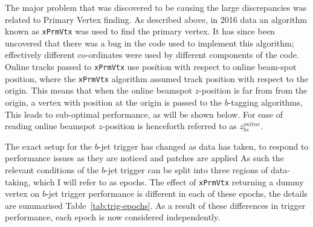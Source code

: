 The major problem that was discovered to be causing the large discrepancies was related to Primary Vertex finding.
As described above, in 2016 data an algorithm known as \verb|xPrmVtx| was used to find the primary vertex.
It has since been uncovered that there was a bug in the code used to implement this algorithm;
effectively different co-ordinates were used by different components of the code.
Online tracks passed to \verb|xPrmVtx| use position with respect to online beam-spot position,
where the \verb|xPrmVtx| algorithm assumed track position with respect to the origin.
This means that when the online beamspot $z$-position is far from from the origin,
a vertex with position at the origin is passed to the $b$-tagging algorithms,
This leads to sub-optimal performance, as will be shown below.
For ease of reading online beamspot $z$-position is henceforth referred to as $z_{bs}^{online}$.  

The exact setup for the $b$-jet trigger has changed as data has taken, to respond to performance issues as they are noticed and patches are applied
As such the relevant conditions of the $b$-jet trigger can be split into three regions of data-taking, which I will refer to as epochs.
The effect of \verb|xPrmVtx| returning a dummy vertex on $b$-jet trigger performance is different in each of these epochs,
the details are summarised Table~\ref{tab:trig-epochs}.
As a result of these differences in trigger performance, each epoch is now considered independently.

